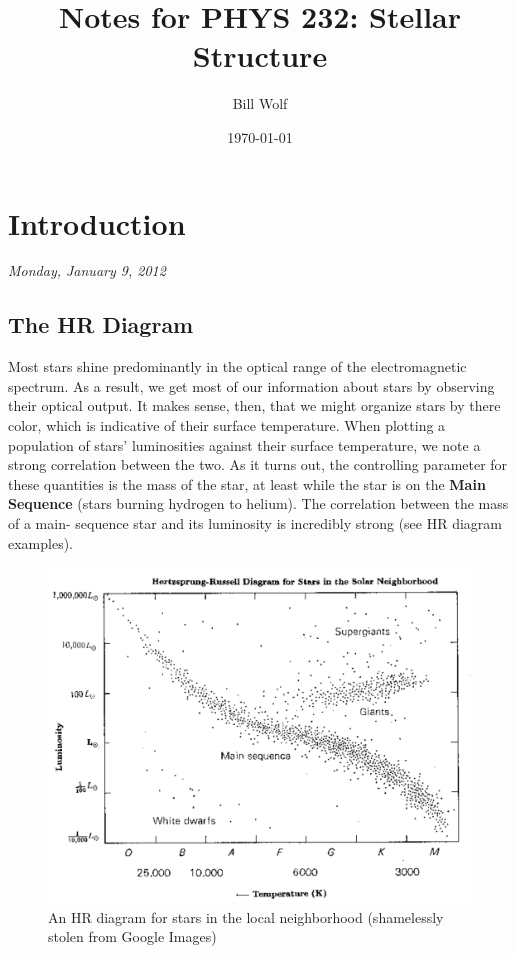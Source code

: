 \documentclass[10pt]{article}
\title{Notes for PHYS 232: Stellar Structure}
\author{Bill Wolf}
\date{\today}
\numberwithin{equation}{section}
\begin{document}
\vfill\maketitle\vfill \newpage

\tableofcontents \newpage


\section{Introduction}
	\emph{Monday, January 9, 2012}
	\subsection{The HR Diagram} 
	Most stars shine predominantly in the optical range of the 
electromagnetic spectrum. As a result, we get most of our information about 
stars by observing their optical output.  It makes sense, then, that we 
might organize stars by there color, which is indicative of their surface 
temperature. When plotting a population of stars' luminosities against 
their surface temperature, we note a strong correlation between the two. As 
it turns out, the controlling parameter for these quantities is the mass of 
the star, at least while the star is on the \textbf{Main Sequence} (stars 
burning hydrogen to helium). The correlation between the mass of a main-
sequence star and its luminosity is incredibly strong (see HR diagram 
examples).
	\begin{figure}
		\centering
		\includegraphics[width=6in]{hr_local.pdf}
		\caption{An HR diagram for stars in the local neighborhood 
(shamelessly stolen from Google Images)}
		\label{HR.1f}
	\end{figure}
\end{document}
